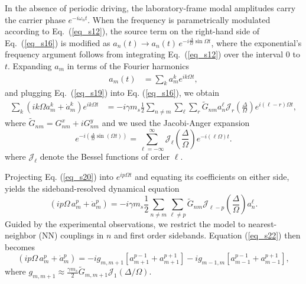 \documentclass[
twocolumn,

superscriptaddress,









 amsmath,amssymb,
 aps,


prl,




]{revtex4-2}
\begin{document}
In the absence of periodic driving, the laboratory-frame modal amplitudes carry the carrier phase \(e^{-i\omega_n t}\).
When the frequency is parametrically modulated according to Eq.~(\ref{eq_s12}), the source term on the right-hand side of Eq.~(\ref{eq_s16}) is modified as $a_n(t) \to a_n(t)\, e^{-i  \tfrac{\Delta}{\Omega} \sin \Omega t }$, where the exponential’s frequency argument follows from integrating Eq.~(\ref{eq_s12}) over the interval $0$ to $t$. Expanding $a_m$ in terms of the Fourier harmonics
\begin{align}
a_m(t) &= \sum_k a_m^k e^{ik\Omega t},\label{eq_s19}
\end{align}
and plugging Eq.~(\ref{eq_s19}) into Eq. (\ref{eq_s16}), we obtain
\begin{align}
\sum_k \left( i k \Omega a_m^k + \dot{a}_m^k \right) e^{i k \Omega t}
&= -i \gamma m_s \frac{1}{2} \sum_{n \neq m} \sum_{\ell} \sum_{r}
\tilde{G}_{nm} a_n^\ell \mathcal{J}_r\!\left( \frac{\Delta}{\Omega} \right) e^{i (\ell - r) \Omega t}, \label{eq_s20}
\end{align}
where $\tilde{G}_{nm}=G^x_{nm} + i G^y_{nm}$ and we used the Jacobi-Anger expansion
\begin{equation}
e^{-i \left(  \frac{\Delta}{\Omega} \sin(\Omega t) \right)} = \sum_{\ell=-\infty}^{\infty} \mathcal{J}_{\ell}\left( \frac{\Delta}{\Omega}\right) e^{-i (\ell \Omega)t} .
\label{eq_s21}
\end{equation}
where $\mathcal{J}_{\ell}$ denote the Bessel functions of order $\ell$.


Projecting Eq. (\ref{eq_s20}) into $e^{i p \Omega t}$ and equating its coefficients on either side, yields the sideband-resolved dynamical equation
\begin{equation}
\left( i p \Omega \, a_m^p + \dot{a}_m^p \right)
= -i \gamma m_s \frac{1}{2} \sum_{n \neq m} \sum_{\ell \neq p}
\tilde{G}_{nm} \mathcal{J}_{\ell - p}\!\left( \frac{\Delta}{\Omega} \right)a_n^\ell \label{eq_s22}.
\end{equation}
Guided by the experimental observations, we restrict the model to nearest-neighbor (NN) couplings in $n$ and first order sidebands.
 Equation (\ref{eq_s22}) then becomes
\begin{equation}
    \left( i p \Omega \, a_m^p + \dot{a}_m^p \right)=-ig_{m,m+1}\!\left[a_{m+1}^{p-1}+a_{m+1}^{p+1}\right]
-i g_{m-1,m}\!\left[a_{m-1}^{p-1}+a_{m-1}^{p+1}\right],\label{eq_s22.1}
\end{equation}
where $g_{m,m+1}\approx \frac{\gamma m_s}{2}\tilde{G}_{m,m+1}\mathcal{J}_1(\Delta/\Omega)$.
\end{document}
